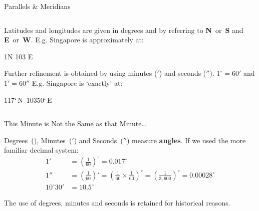 \begin{myFrame}{Parallels \& Meridians}{}
\begin{columns}
\setCol
\begin{itemize}
\col Latitudes and longitudes are given in degrees and by referring to \textbf{N}~or~\textbf{S} and \textbf{E}~or~\textbf{W}.
%
\col E.g. Singapore is approximately at:  
\begin{center}\scriptsize
1\s{$\circ$}N 103\s{$\circ$} E
\end{center}
%
\col Further refinement is obtained by using minutes ($'$) and seconds ($''$).
%
\col $1^{\circ} = 60'$ and $1' = 60''$
%
\col E.g. Singapore is `exactly' at: 
\begin{center}\scriptsize
1\s{$\circ$}17`\,N~103\s{$\circ$}50`\,E
\end{center}
%
\end{itemize}
%
%
\end{columns}

\end{myFrame}

\begin{myFrame}{This Minute is Not the Same as that Minute\ldots}{}
\medskip
{}
\setCol
\begin{itemize}
\col Degrees~(\s{$\circ$}), Minutes~($'$) and Seconds~($''$) measure \textbf{angles}.
\col If we used the more familiar decimal system:
\scriptsize
\begin{align*}
1' &= \left(\frac{1}{60}\right)^\circ = 0.017^\circ\\
1'' &= \left(\frac{1}{60}\right)'=\left(\frac{1}{60}\times\frac{1}{60}\right)^\circ = \left(\frac{1}{3,600}\right)^\circ = 0.00028^\circ\\
10^\circ 30' &= 10.5^\circ
\end{align*}

\col The use of degrees, minutes and seconds is retained for historical reasons.
\end{itemize}


\end{myFrame}

